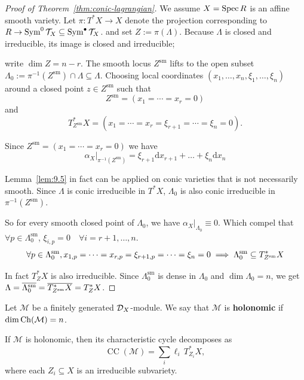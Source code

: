 \begin{proof}[Proof of Theorem~\ref{thm:conic-lagrangian}]
    We assume $X = \operatorname{Spec} R$ is an affine smooth variety. Let $\pi\colon T^\ast X\to X$ denote the projection corresponding to $R \to \operatorname{Sym}^0 \mathcal{T}_X \subseteq \operatorname{Sym}^\bullet \mathcal{T}_X$. and set $Z:=\pi(\Lambda)$.
    Because $\Lambda$ is closed and irreducible, its image is closed and irreducible;

    write
    $\dim Z=n-r$.  The smooth locus $Z^{\mathrm{sm}}$ lifts to the open subset
    $\Lambda_0:=\pi^{-1}(Z^{\mathrm{sm}})\cap \Lambda\subseteq \Lambda$.  Choosing local
    coordinates $(x_1,\dots,x_n,\xi_1,\dots,\xi_n)$ around a closed point $z\in Z^{\mathrm{sm}}$ such that
    \[
        Z^{\mathrm{sm}}=(x_1=\cdots=x_r=0)
    \]
    and
    \[
        T^\ast_{Z^{\mathrm{sm}}} X=(x_1=\cdots=x_r=\xi_{r+1}=\cdots=\xi_n=0).
    \]

    Since $Z^{\mathrm{sm}}=(x_1=\cdots=x_r=0)$ we have
    \[
        \alpha_X|_{\pi^{-1}(Z^{\mathrm{sm}})} = \xi_{r+1} \text{d}x_{r+1} + \dots + \xi_n \text{d}x_n
    \]

    Lemma~\ref{lem:9.5} in fact can be applied on conic varieties that is not necessarily smooth. Since $\Lambda$ is conic irreducible in $T^{\ast}X$, $\Lambda_0$ is also conic irreducible in $\pi^{-1}(Z^{\mathrm{sm}})$.

    So for every smooth closed point of $\Lambda_0$, we have $\alpha_X|_{\Lambda_0} \equiv 0$. Which compel that $\forall p \in \Lambda_0^{\mathrm{sm}}$, $\xi_{i,p} = 0 \quad \forall i = r+1, \dots, n$.
    \[
        \forall p \in \Lambda_0^{\mathrm{sm}}, x_{1,p} = \dots = x_{r,p} = \xi_{r+1,p} = \dots = \xi_n = 0 \implies \Lambda_0^{\mathrm{sm}} \subseteq T^{\ast}_{Z^{\mathrm{sm}}} X
    \]

    In fact $T^{\ast}_Z X$ is  also irreducible.
    Since $\Lambda_0^{\mathrm{sm}}$ is dense in $\Lambda_0$ and $\dim \Lambda_0 = n$, we get $\Lambda = \overline{\Lambda_0^{\mathrm{sm}}} = \overline{T^{\ast}_{Z^{\mathrm{sm}}} X} = T^{\ast}_Z X$.
\end{proof}

\begin{definition}
    Let $\mathcal M$ be a finitely generated $\mathcal{D}_X$-module.  We say that
    $\mathcal M$ is \textbf{holonomic} if $\dim \operatorname{Ch}(\mathcal M)=n$.
\end{definition}

\begin{corollary}\label{cor:holonomic-char-cycle}
    If $\mathcal M$ is holonomic, then its characteristic cycle decomposes as
    \[
        \operatorname{CC}(\mathcal M)
        = \sum_i \ell_i\, T^\ast_{Z_i} X,
    \]
    where each $Z_i\subseteq X$ is an irreducible subvariety.
\end{corollary}

